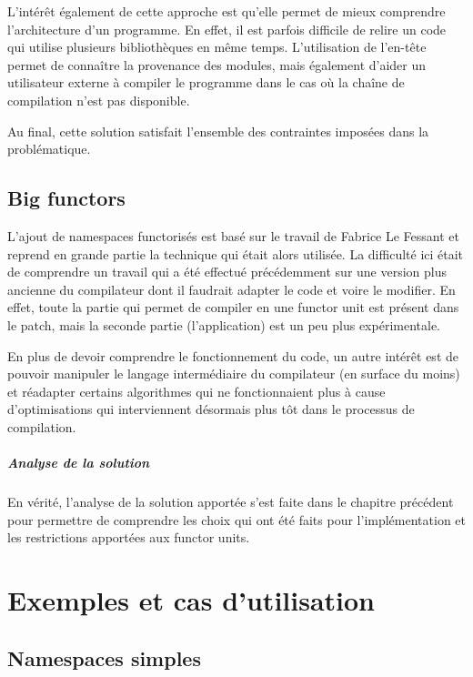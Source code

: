 \documentclass[11pt,a4paper]{report}
\begin{document}
L'intérêt également de cette approche est qu'elle permet de mieux comprendre
l'architecture d'un programme. En effet, il est parfois difficile de relire un
code qui utilise plusieurs bibliothèques en même temps. L'utilisation de
l'en-tête permet de connaître la provenance des modules, mais également d'aider
un utilisateur externe à compiler le programme dans le cas où la chaîne de
compilation n'est pas disponible.

Au final, cette solution satisfait l'ensemble des contraintes imposées dans la
problématique.

\section{Big functors}

L'ajout de namespaces functorisés est basé sur le travail de Fabrice Le Fessant
\cite{lefessant-bigfunctors} et reprend en grande partie la technique qui était
alors utilisée. La difficulté ici était de comprendre un travail qui a été
effectué précédemment sur une version plus ancienne du compilateur dont il
faudrait adapter le code et voire le modifier. En effet, toute la partie qui
permet de compiler en une functor unit est présent dans le patch, mais la
seconde partie (l'application) est un peu plus expérimentale.

En plus de devoir comprendre le fonctionnement du code, un autre intérêt est de
pouvoir manipuler le langage intermédiaire du compilateur (en surface du moins)
et réadapter certains algorithmes qui ne fonctionnaient plus à cause
d'optimisations qui interviennent désormais plus tôt dans le processus de
compilation.

\paragraph{Analyse de la solution}

En vérité, l'analyse de la solution apportée s'est faite dans le chapitre
précédent pour permettre de comprendre les choix qui ont été faits pour
l'implémentation et les restrictions apportées aux functor units.

\chapter{Exemples et cas d'utilisation}

\section{Namespaces simples}
\end{document}
